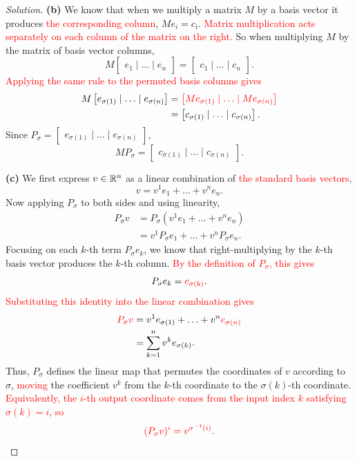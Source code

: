 \begin{proof}[Solution]
\textbf{(b)} We know that when we multiply a matrix \(M\) by a basis
vector it produces \textcolor{red}{the corresponding column},
\(Me_i=c_i\). \textcolor{red}{Matrix multiplication acts separately on
each column of the matrix on the right.} So when multiplying \(M\) by
the matrix of basis vector columns,
\[
  M\begin{bmatrix}e_1\mid\ldots\mid e_n\end{bmatrix}
    =\begin{bmatrix}c_1\mid\ldots\mid c_n\end{bmatrix}.
\]
\textcolor{red}{Applying the same rule to the permuted basis columns gives}
\begin{align*}
  M\begin{bmatrix}e_{\sigma(1)}\mid\ldots\mid e_{\sigma(n)}\end{bmatrix}
    &=\textcolor{red}{\begin{bmatrix}Me_{\sigma(1)}\mid\ldots\mid
      Me_{\sigma(n)}\end{bmatrix}}\\
    &=\begin{bmatrix}c_{\sigma(1)}\mid\ldots\mid c_{\sigma(n)}\end{bmatrix}.
\end{align*}
Since \(P_\sigma=\begin{bmatrix}e_{\sigma(1)}\mid\ldots\mid
e_{\sigma(n)}\end{bmatrix}\),
\[
  MP_\sigma=\begin{bmatrix}c_{\sigma(1)}\mid\ldots\mid
    c_{\sigma(n)}\end{bmatrix}.
\]

\textbf{(c)} We first express \(v\in\mathbb{R}^n\) as a linear combination
of \textcolor{red}{the standard basis vectors},
\[
  v=v^1e_1+\ldots+v^ne_n.
\]
Now applying \(P_\sigma\) to both sides and using linearity,
\begin{align*}
  P_\sigma v&=P_\sigma(v^1e_1+\ldots+v^ne_n)\\
    &=v^1P_\sigma e_1+\ldots+v^nP_\sigma e_n.
\end{align*}
Focusing on each \(k\)-th term \(P_\sigma e_k\), we know that
right-multiplying by the \(k\)-th basis vector produces the \(k\)-th
column. \textcolor{red}{By the definition of \(P_\sigma\), this gives}
\[
  P_\sigma e_k=\textcolor{red}{e_{\sigma(k)}}.
\]
\textcolor{red}{Substituting this identity into the linear combination gives}
\begin{align*}
  \textcolor{red}{P_\sigma v}
    &=v^1e_{\sigma(1)}+\ldots+v^n\textcolor{red}{e_{\sigma(n)}}\\
    &=\sum_{k=1}^n v^ke_{\sigma(k)}.
\end{align*}
Thus, \(P_\sigma\) defines the linear map that permutes the coordinates
of \(v\) according to \(\sigma\), \textcolor{red}{moving} the coefficient
\(v^k\) from the \(k\)-th coordinate to the \(\sigma(k)\)-th coordinate.
\textcolor{red}{Equivalently, the \(i\)-th output coordinate comes from
the input index \(k\) satisfying \(\sigma(k)=i\), so}
\[
  \textcolor{red}{(P_\sigma v)^i=v^{\sigma^{-1}(i)}.}
\]


\end{proof}
